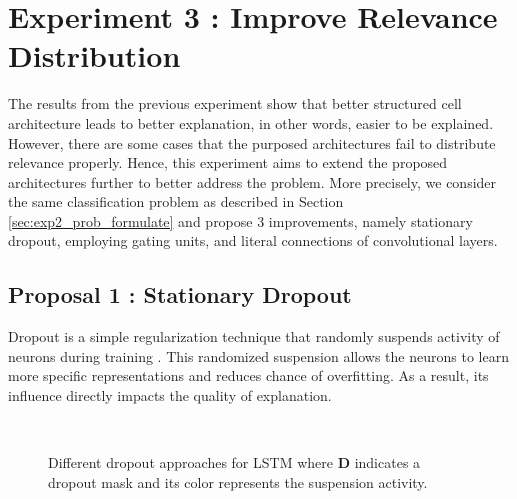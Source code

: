 \section{Experiment 3 : Improve Relevance Distribution}
The results from the previous experiment show that better structured cell architecture leads to better explanation, in other words, easier to be explained. However, there are some cases that the purposed architectures fail to distribute relevance properly.  Hence, this experiment aims to extend the proposed architectures further to better address the problem. More precisely, we consider the same classification problem as described in Section \ref{sec:exp2_prob_formulate} and propose 3 improvements, namely stationary dropout, employing gating units,  and literal connections of convolutional layers.


\subsection{Proposal 1 :  Stationary Dropout}
Dropout is a simple regularization technique that randomly suspends activity of neurons during training\cite{SrivastavaDropoutSimpleWay2014} . This randomized suspension allows the neurons to learn more specific representations and reduces chance of overfitting.  As a result, its influence directly impacts the quality of explanation. 





\begin{figure}[!htb]
\centering
{} \\

\caption{Different dropout approaches for LSTM where \textcircled{\tiny \textbf D} indicates a dropout mask and its color represents the suspension activity.}
\label{fig:dropout_lstm}
\end{figure}

